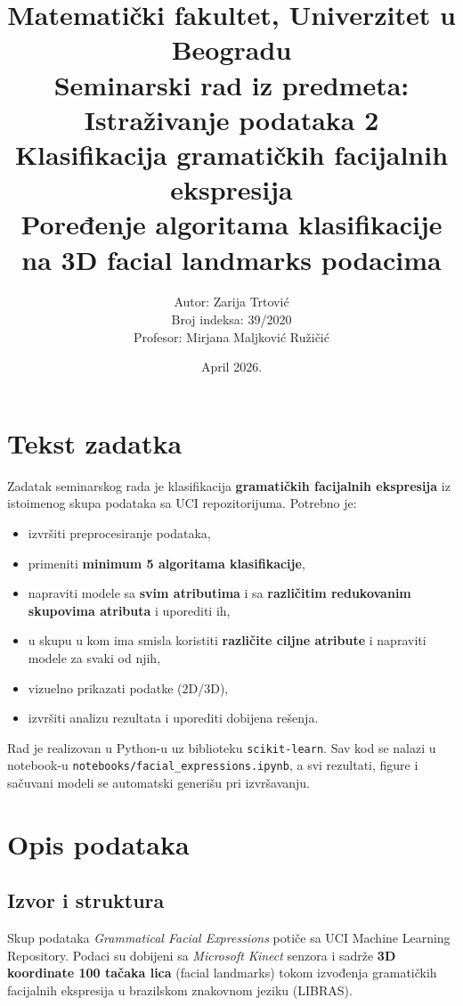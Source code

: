 \documentclass[12pt,a4paper]{article}
\title{
    \Large \textbf{Matematički fakultet, Univerzitet u Beogradu} \\[0.5cm]
    \large Seminarski rad iz predmeta: Istraživanje podataka 2 \\[1cm]
    \LARGE \textbf{Klasifikacija gramatičkih facijalnih ekspresija} \\[0.5cm]
    \large Poređenje algoritama klasifikacije na 3D facial landmarks podacima
}
\author{
    Autor: Zarija Trtović\\
    Broj indeksa: 39/2020 \\[0.5cm]
    Profesor: Mirjana Maljković Ružičić
}
\date{April 2026.}
\begin{document}
\maketitle
\thispagestyle{empty}
\newpage

\tableofcontents
\newpage

\section{Tekst zadatka}

Zadatak seminarskog rada je klasifikacija \textbf{gramatičkih facijalnih ekspresija} iz istoimenog skupa podataka sa UCI repozitorijuma. Potrebno je:

\begin{itemize}
    \item izvršiti preprocesiranje podataka,
    \item primeniti \textbf{minimum 5 algoritama klasifikacije},
    \item napraviti modele sa \textbf{svim atributima} i sa \textbf{različitim redukovanim skupovima atributa} i uporediti ih,
    \item u skupu u kom ima smisla koristiti \textbf{različite ciljne atribute} i napraviti modele za svaki od njih,
    \item vizuelno prikazati podatke (2D/3D),
    \item izvršiti analizu rezultata i uporediti dobijena rešenja.
\end{itemize}

Rad je realizovan u Python-u uz biblioteku \texttt{scikit-learn}. Sav kod se nalazi u notebook-u \texttt{notebooks/facial\_expressions.ipynb}, a svi rezultati, figure i sačuvani modeli se automatski generišu pri izvršavanju.

\section{Opis podataka}

\subsection{Izvor i struktura}

Skup podataka \textit{Grammatical Facial Expressions} potiče sa UCI Machine Learning Repository. Podaci su dobijeni sa \textit{Microsoft Kinect} senzora i sadrže \textbf{3D koordinate 100 tačaka lica} (facial landmarks) tokom izvođenja gramatičkih facijalnih ekspresija u brazilskom znakovnom jeziku (LIBRAS).
\end{document}
